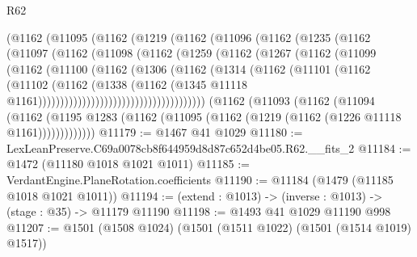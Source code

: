 \begin{lexlean}{R62}
\begin{coremodule}
                  (@1162
                    (@11095
                      (@1162
                        (@1219
                          (@1162
                            (@11096
                              (@1162
                                (@1235
                                  (@1162
                                    (@11097
                                      (@1162
                                        (@11098
                                          (@1162
                                            (@1259
                                              (@1162
                                                (@1267
                                                  (@1162
                                                    (@11099
                                                      (@1162
                                                        (@11100
                                                          (@1162
                                                            (@1306
                                                              (@1162
                                                                (@1314
                                                                  (@1162
                                                                    (@11101
                                                                      (@1162
                                                                        (@11102
                                                                          (@1162
                                                                            (@1338
                                                                              (@1162
                                                                                (@1345
                                                                                  @11118
                                                                                  @1161))))))))))))))))))))))))))))))))))))))
      (@1162
        (@11093
          (@1162
            (@11094
              (@1162
                (@1195 @1283 (@1162 (@11095 (@1162 (@1219 (@1162 (@1226 @11118 @1161)))))))))))))
@11179 := @1467 @41 @1029
@11180 := LexLeanPreserve.C69a0078cb8f644959d8d87c652d4be05.R62.__fits_2
@11184 := @1472 (@11180 @1018 @1021 @1011)
@11185 := VerdantEngine.PlaneRotation.coefficients
@11190 := @11184 (@1479 (@11185 @1018 @1021 @1011))
@11194 := (extend : @1013) -> (inverse : @1013) -> (stage : @35) -> @11179 @11190
@11198 := @1493 @41 @1029 @11190 @998
@11207 := @1501 (@1508 @1024) (@1501 (@1511 @1022) (@1501 (@1514 @1019) @1517))

\end{coremodule}
\end{lexlean}
